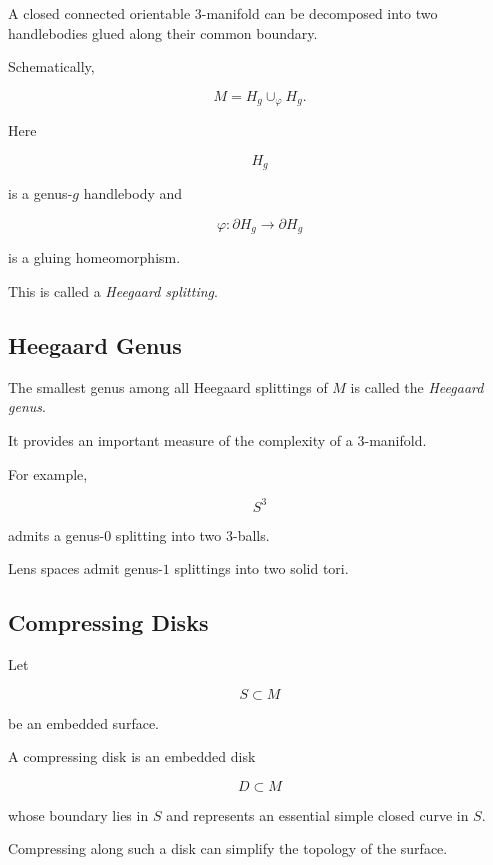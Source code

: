 A closed connected orientable \(3\)-manifold can be decomposed into two
handlebodies glued along their common boundary.

Schematically,

\[
\boxed{
M
=
H_g\cup_{\varphi}H_g.
}
\]

Here

\[
H_g
\]

is a genus-\(g\) handlebody and

\[
\varphi:\partial H_g\to\partial H_g
\]

is a gluing homeomorphism.

This is called a \emph{Heegaard splitting}.

\subsection{Heegaard Genus}
\label{subsec:heegaard-genus}

The smallest genus among all Heegaard splittings of \(M\) is called the
\emph{Heegaard genus}.

It provides an important measure of the complexity of a \(3\)-manifold.

For example,

\[
S^3
\]

admits a genus-\(0\) splitting into two \(3\)-balls.

Lens spaces admit genus-\(1\) splittings into two solid tori.

\subsection{Compressing Disks}
\label{subsec:compressing-disks}

Let

\[
S\subset M
\]

be an embedded surface.

A compressing disk is an embedded disk

\[
D\subset M
\]

whose boundary lies in \(S\) and represents an essential simple closed curve
in \(S\).

Compressing along such a disk can simplify the topology of the surface.

